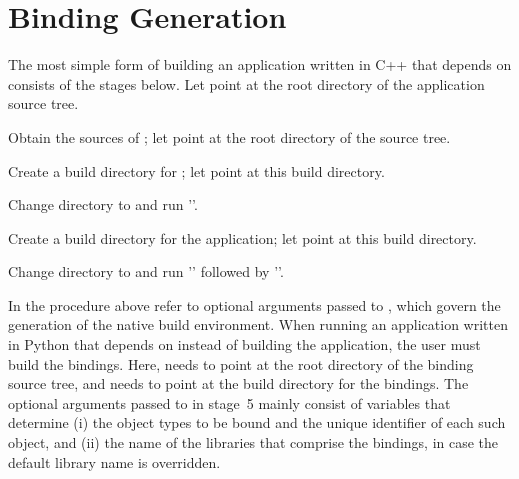 \section{Binding Generation}
\label{sec:gen}
The most simple form of building an application written in C++ that
depends on \cgal{} consists of the stages below. Let
 point at the root directory of the
application source tree.
\begin{compactenum}
\item Obtain the sources of \cgal{}; let 
  point at the root directory of the \cgal{} source tree.
\item Create a build directory for \cgal{}; let 
  point at this build directory.
\item Change directory to  and run
  ''.
\item Create a build directory for the application; let
   point at this build directory.
\item Change directory to  and run
  '' followed by
  ''.
\end{compactenum}

In the procedure above  refer to optional
arguments passed to , which govern the generation
of the native build environment. When running an application written
in Python that depends on \cgal{} instead of building the application,
the user must build the bindings. Here, 
needs to point at the root directory of the binding source tree,
and  needs to point at the build directory for
the bindings. The optional arguments passed to  in
stage~5 mainly consist of variables that determine (i) the object
types to be bound and the unique identifier of each such object, and
(ii) the name of the libraries that comprise the bindings, in case the
default library name is overridden.

